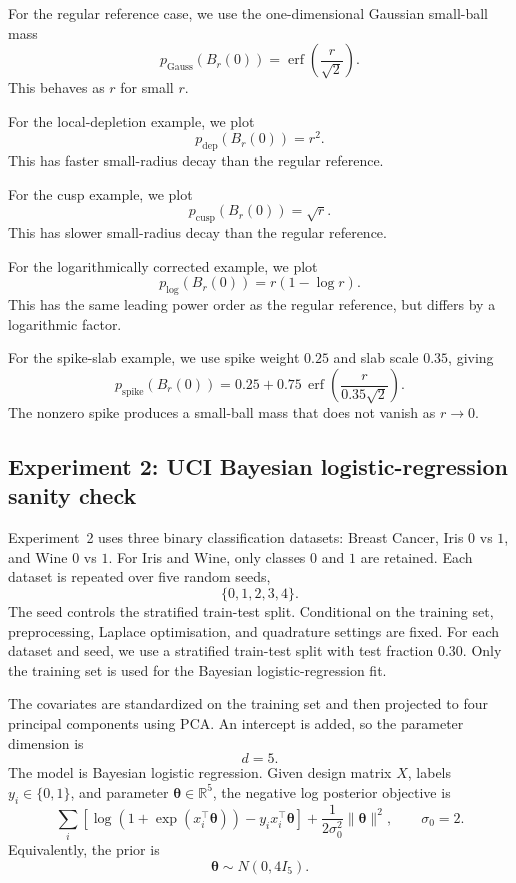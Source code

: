 \documentclass[11pt,a4paper]{article}
\newcommand{\pa}{\boldsymbol\theta}
\theoremstyle{compactplain}
\theoremstyle{compactdefinition}
\numberwithin{equation}{section}
\begin{document}
For the regular reference case, we use the one-dimensional Gaussian small-ball mass
\[
p_{\mathrm{Gauss}}(B_r(0))
=
\operatorname{erf}\left(\frac{r}{\sqrt{2}}\right).
\]
This behaves as \(r\) for small \(r\).

For the local-depletion example, we plot
\[
p_{\mathrm{dep}}(B_r(0))=r^2.
\]
This has faster small-radius decay than the regular reference.

For the cusp example, we plot
\[
p_{\mathrm{cusp}}(B_r(0))=\sqrt r.
\]
This has slower small-radius decay than the regular reference.

For the logarithmically corrected example, we plot
\[
p_{\log}(B_r(0))=r(1-\log r).
\]
This has the same leading power order as the regular reference, but differs by a logarithmic factor.

For the spike-slab example, we use spike weight \(0.25\) and slab scale \(0.35\), giving
\[
p_{\mathrm{spike}}(B_r(0))
=
0.25
+
0.75\,
\operatorname{erf}\left(
\frac{r}{0.35\sqrt{2}}
\right).
\]
The nonzero spike produces a small-ball mass that does not vanish as \(r\to0\).

\subsection{Experiment 2: UCI Bayesian logistic-regression sanity check}
\label{app:uci_experiment}

Experiment~2 uses three binary classification datasets: Breast Cancer, Iris \(0\) vs \(1\), and Wine \(0\) vs \(1\). For Iris and Wine, only classes \(0\) and \(1\) are retained. Each dataset is repeated over five random seeds,
\[
\{0,1,2,3,4\}.
\]
The seed controls the stratified train-test split. Conditional on the training set, preprocessing, Laplace optimisation, and quadrature settings are fixed.
For each dataset and seed, we use a stratified train-test split with test fraction \(0.30\). Only the training set is used for the Bayesian logistic-regression fit.

The covariates are standardized on the training set and then projected to four principal components using PCA. An intercept is added, so the parameter dimension is
\[
d=5.
\]
The model is Bayesian logistic regression. Given design matrix \(X\), labels \(y_i\in\{0,1\}\), and parameter \(\pa\in\mathbb R^5\), the negative log posterior objective is
\[
\sum_i
\left[
\log(1+\exp(x_i^\top\pa))
-
y_i x_i^\top\pa
\right]
+
\frac{1}{2\sigma_0^2}\|\pa\|^2,
\qquad
\sigma_0=2.
\]
Equivalently, the prior is
\[
\pa\sim N(0,4I_5).
\]
\end{document}
